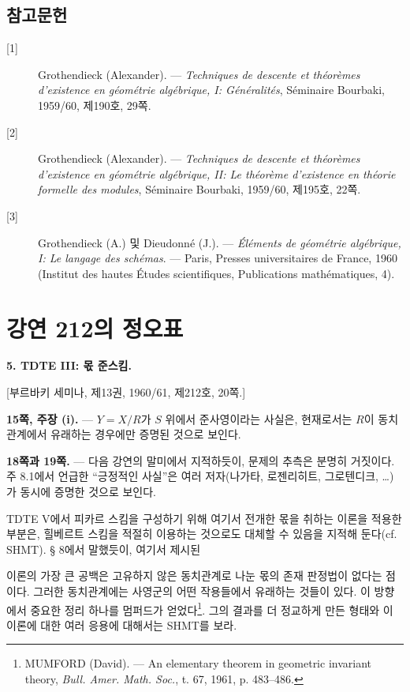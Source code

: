 \documentclass[11pt,twoside,openany]{book}
\numberwithin{equation}{section}
\newcommand{\sourceunit}{front}
\newcommand{\src}[1]{%
  \phantomsection\hypertarget{src:\sourceunit:#1}{}%
  \marginpar{\raggedleft\footnotesize\sffamily #1}%
}
\theoremstyle{plain}
\theoremstyle{definition}
\theoremstyle{remark}
\begin{document}
\section*{참고문헌}

\begin{description}
\item[{[1]}] Grothendieck (Alexander). --- \emph{Techniques de descente et
théorèmes d'existence en géométrie algébrique, I: Généralités}, Séminaire
Bourbaki, 1959/60, 제190호, 29쪽.

\item[{[2]}] Grothendieck (Alexander). --- \emph{Techniques de descente et
théorèmes d'existence en géométrie algébrique, II: Le théorème d'existence en
théorie formelle des modules}, Séminaire Bourbaki, 1959/60, 제195호, 22쪽.

\item[{[3]}] Grothendieck (A.) 및 Dieudonné (J.). --- \emph{Éléments de
géométrie algébrique, I: Le langage des schémas}. --- Paris, Presses
universitaires de France, 1960 (Institut des hautes Études scientifiques,
Publications mathématiques, 4).
\end{description}


\par
\renewcommand{\sourceunit}{e212}
\clearpage
\chapter*{강연 212의 정오표}
\setcounter{footnote}{2}
\src{301}

\noindent\textbf{5. TDTE III: 몫 준스킴.}

\begin{center}
[부르바키 세미나, 제13권, 1960/61, 제212호, 20쪽.]
\end{center}

\noindent\textbf{15쪽, 주장 (i).} --- $Y=X/R$가 $S$ 위에서
준사영이라는 사실은, 현재로서는 $R$이 동치관계에서 유래하는 경우에만
증명된 것으로 보인다.

\noindent\textbf{18쪽과 19쪽.} --- 다음 강연의 말미에서 지적하듯이,
문제의 추측은 분명히 거짓이다. 주 8.1에서 언급한 ``긍정적인 사실''은
여러 저자(나가타, 로젠리히트, 그로텐디크, \ldots)가 동시에 증명한 것으로
보인다.

TDTE V에서 피카르 스킴을 구성하기 위해 여기서 전개한 몫을 취하는 이론을
적용한 부분은, 힐베르트 스킴을 적절히 이용하는 것으로도 대체할 수 있음을
지적해 둔다(cf. SHMT). § 8에서 말했듯이, 여기서 제시된
\src{302}
이론의 가장 큰 공백은 고유하지 않은 동치관계로 나눈 몫의 존재 판정법이
없다는 점이다. 그러한 동치관계에는 사영군의 어떤 작용들에서 유래하는
것들이 있다. 이 방향에서 중요한 정리 하나를 멈퍼드가 얻었다\footnote{MUMFORD
(David). --- An elementary theorem in geometric invariant theory, \emph{Bull.
Amer. Math. Soc.}, t. 67, 1961, p. 483--486.}. 그의 결과를 더 정교하게 만든
형태와 이 이론에 대한 여러 응용에 대해서는 SHMT를 보라.\par
\end{document}
